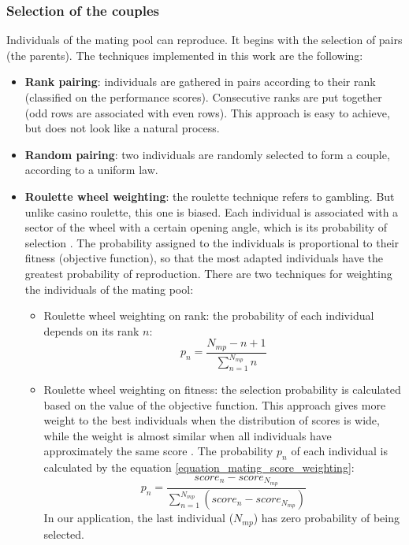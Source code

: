\documentclass[twocol]{ametsoc}
\begin{document}
\subsubsection{Selection of the couples}

Individuals of the mating pool can reproduce. It begins with the selection of pairs (the parents). The techniques implemented in this work are the following:


\begin{itemize}
	\item \textbf{Rank pairing}: individuals are gathered in pairs according to their rank (classified on the performance scores). Consecutive ranks are put together (odd rows are associated with even rows). This approach is easy to achieve, but does not look like a natural process.
	
	\item \textbf{Random pairing}: two individuals are randomly selected to form a couple, according to a uniform law.
	
	\item \textbf{Roulette wheel weighting}: the roulette technique refers to gambling. But unlike casino roulette, this one is biased. Each individual is associated with a sector of the wheel with a certain opening angle, which is its probability of selection \citep{Haupt2004}. The probability assigned to the individuals is proportional to their fitness (objective function), so that the most adapted individuals have the greatest probability of reproduction. There are two techniques for weighting the individuals of the mating pool:
	\begin{itemize}
		\item Roulette wheel weighting on rank: the probability of each individual depends on its rank $n$:
		\begin{equation}
		p_{n}=\dfrac{N_{mp}-n+1}{\sum^{N_{mp}}_{n=1}n}
		\label{equation_mating_rank_weighting}
		\end{equation}
		
		\item Roulette wheel weighting on fitness: the selection probability is calculated based on the value of the objective function. This approach gives more weight to the best individuals when the distribution of scores is wide, while the weight is almost similar when all individuals have approximately the same score \citep{Haupt2004}. The probability $p_{n}$ of each individual is calculated by the equation \ref{equation_mating_score_weighting}:
		\begin{equation}
		p_{n}=\frac{score_{n}-score_{N_{mp}}}{\sum_{n=1}^{N_{mp}} (score_{n}-score_{N_{mp}})}
		\label{equation_mating_score_weighting}
		\end{equation}
		In our application, the last individual ($N_{mp}$) has zero probability of being selected.
	\end{itemize}
	

\end{itemize}
\end{document}
